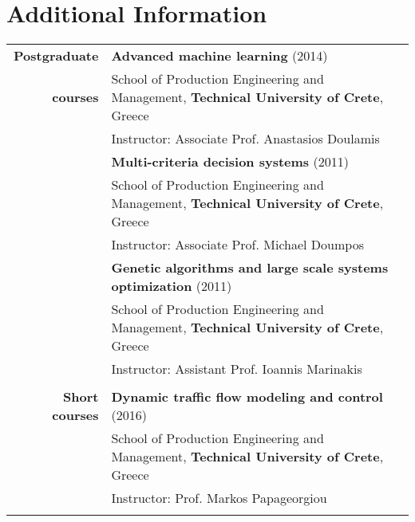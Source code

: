 \documentclass[a4paper,10pt]{article}
\begin{document}
\section{Additional Information}
\begin{longtable}{r p{11cm}}
\textbf{Postgraduate} & \textbf{Advanced machine learning} (2014)\\
\textbf{courses} & School of Production Engineering and Management, \textbf{Technical University of Crete}, Greece\\
& Instructor: Associate Prof. Anastasios Doulamis \vspace{0.05in}\\

& \textbf{Multi-criteria decision systems} (2011)\\
& School of Production Engineering and Management, \textbf{Technical University of Crete}, Greece\\
& Instructor: Associate Prof. Michael Doumpos  \vspace{0.05in}\\

& \textbf{Genetic algorithms and large scale systems optimization} (2011)\\
&School of Production Engineering and Management, \textbf{Technical University of Crete}, Greece\\
& Instructor: Assistant Prof. Ioannis Marinakis \\

\vspace{0.01in}\\

\textbf{Short courses}& \textbf{Dynamic traffic flow modeling and control} (2016)\\
& School of Production Engineering and Management, \textbf{Technical University of Crete}, Greece\\
& Instructor: Prof. Markos Papageorgiou \\

\vspace{0.01in}\\




\end{longtable}
\end{document}
